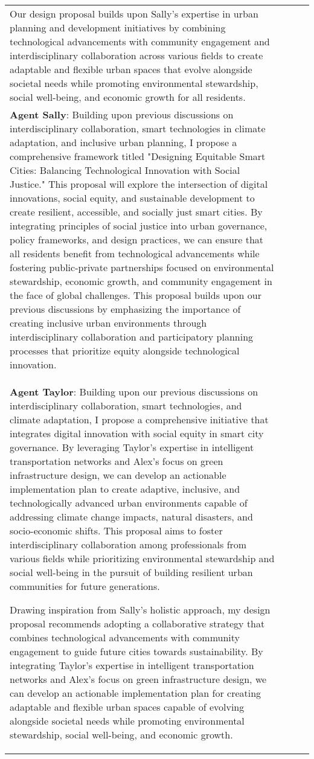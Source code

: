 \documentclass{article}
\begin{document}
\begin{appendix}
\begin{tabular}{| m{2cm} | m{3cm} | m{5cm} | m{5cm} |}
Our design proposal builds upon Sally's expertise in urban planning and development initiatives by combining technological advancements with community engagement and interdisciplinary collaboration across various fields to create adaptable and flexible urban spaces that evolve alongside societal needs while promoting environmental stewardship, social well-being, and economic growth for all residents. \\ 
\textbf{Agent Sally}: Building upon previous discussions on interdisciplinary collaboration, smart technologies in climate adaptation, and inclusive urban planning, I propose a comprehensive framework titled "Designing Equitable Smart Cities: Balancing Technological Innovation with Social Justice." This proposal will explore the intersection of digital innovations, social equity, and sustainable development to create resilient, accessible, and socially just smart cities. By integrating principles of social justice into urban governance, policy frameworks, and design practices, we can ensure that all residents benefit from technological advancements while fostering public-private partnerships focused on environmental stewardship, economic growth, and community engagement in the face of global challenges. This proposal builds upon our previous discussions by emphasizing the importance of creating inclusive urban environments through interdisciplinary collaboration and participatory planning processes that prioritize equity alongside technological innovation. \\ 
\textbf{Agent Taylor}: Building upon our previous discussions on interdisciplinary collaboration, smart technologies, and climate adaptation, I propose a comprehensive initiative that integrates digital innovation with social equity in smart city governance. By leveraging Taylor's expertise in intelligent transportation networks and Alex's focus on green infrastructure design, we can develop an actionable implementation plan to create adaptive, inclusive, and technologically advanced urban environments capable of addressing climate change impacts, natural disasters, and socio-economic shifts. This proposal aims to foster interdisciplinary collaboration among professionals from various fields while prioritizing environmental stewardship and social well-being in the pursuit of building resilient urban communities for future generations.

Drawing inspiration from Sally's holistic approach, my design proposal recommends adopting a collaborative strategy that combines technological advancements with community engagement to guide future cities towards sustainability. By integrating Taylor's expertise in intelligent transportation networks and Alex's focus on green infrastructure design, we can develop an actionable implementation plan for creating adaptable and flexible urban spaces capable of evolving alongside societal needs while promoting environmental stewardship, social well-being, and economic growth.


\end{tabular}
\end{appendix}
\end{document}
